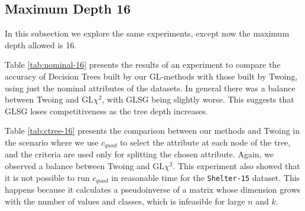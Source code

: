 \subsection{Maximum Depth 16}


In this subsection we explore the same experiments, except now the maximum depth allowed is 16. 

Table \ref{tab:nominal-16} presents  the results of an experiment to
compare the accuracy of  Decision Trees built by our GL-methods with those built by Twoing, using just the nominal attributes of the datasets.
In general there was a balance between Twoing and GL$\chi^2$, with GLSG being slightly worse. This suggests that GLSG loses competitiveness as the tree depth increases.

Table \ref{tab:ctree-16} presents the 
comparison between  our  methods and Twoing in the scenario where we use $c_{quad}$ to select the attribute at each node of the tree, and the criteria are used only for splitting the chosen attribute. Again, we observed a balance between Twoing and GL$\chi^2$. This experiment also showed that it is not possible to run $c_{quad}$ in reasonable time for the {\tt Shelter-15} dataset. This happens because it calculates a pseudoinverse of a matrix whose dimension grows with the number of values and classes, which is infeasible for large $n$ and $k$.



